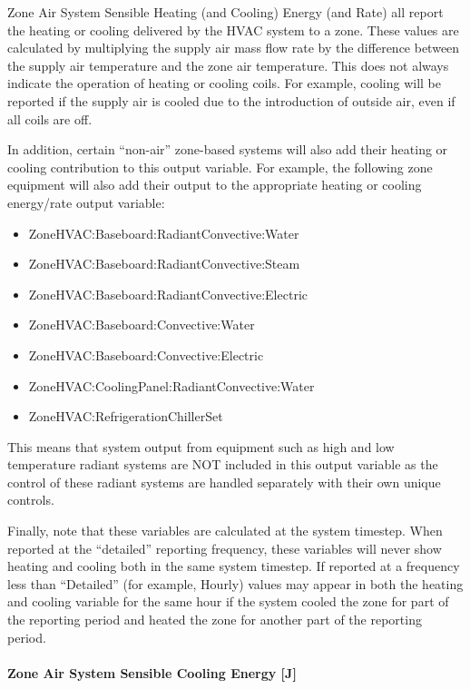 \begin{callout}
Zone Air System Sensible Heating (and Cooling) Energy (and Rate) all report the heating or cooling delivered by the HVAC system to a zone. These values are calculated by multiplying the supply air mass flow rate by the difference between the supply air temperature and the zone air temperature. This does not always indicate the operation of heating or cooling coils. For example, cooling will be reported if the supply air is cooled due to the introduction of outside air, even if all coils are off.

In addition, certain ``non-air'' zone-based systems will also add their heating or cooling contribution to this output variable.  For example, the following zone equipment will also add their output to the appropriate heating or cooling energy/rate output variable:

\begin{itemize}
\item
ZoneHVAC:Baseboard:RadiantConvective:Water
\item
ZoneHVAC:Baseboard:RadiantConvective:Steam
\item
ZoneHVAC:Baseboard:RadiantConvective:Electric
\item
ZoneHVAC:Baseboard:Convective:Water
\item
ZoneHVAC:Baseboard:Convective:Electric
\item
ZoneHVAC:CoolingPanel:RadiantConvective:Water
\item
ZoneHVAC:RefrigerationChillerSet
\end{itemize}

This means that system output from equipment such as high and low temperature radiant systems are NOT included in this output variable as the control of these radiant systems are handled separately with their own unique controls.

Finally, note that these variables are calculated at the system timestep. When reported at the ``detailed'' reporting frequency, these variables will never show heating and cooling both in the same system timestep. If reported at a frequency less than ``Detailed'' (for example, Hourly) values may appear in both the heating and cooling variable for the same hour if the system cooled the zone for part of the reporting period and heated the zone for another part of the reporting period.
\end{callout}

\paragraph{Zone Air System Sensible Cooling Energy {[}J{]}}\label{zone-air-system-sensible-cooling-energy-j}

